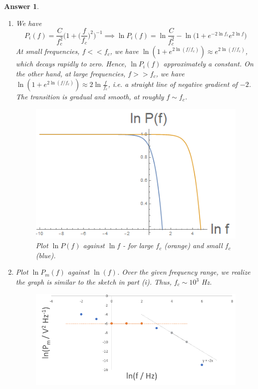 \documentclass[a4paper]{article}
\newtheorem{ans}{Answer}[subsection]
\theoremstyle{new}
\begin{document}
\begin{ans}\leavevmode
\begin{enumerate}[label=(\roman*)]
\item We have
$$P_i(f)=\frac{C}{f_c^2}\bigg(1+\bigg(\frac{f}{f_c}\bigg)^2\bigg)^{-1}\implies\ln P_i(f)=\ln\frac{C}{f_c^2}-\ln\bigg(1+e^{-2\ln f_c}e^{2\ln f}\bigg)$$
At small frequencies, $f<<f_c$, we have $\ln(1+e^{2\ln(f/f_c)})\approx e^{2\ln(f/f_c)}$, which decays rapidly to zero. Hence, $\ln P_i(f)$ approximately a constant. On the other hand, at large frequencies, $f>>f_c$, we have $\ln(1+e^{2\ln(f/f_c)})\approx2\ln\frac{f}{f_c}$, i.e. a straight line of negative gradient of $-2$. The transition is gradual and smooth, at roughly $f\sim f_c$.
\begin{figure}[H]
    \centering
    \includegraphics[scale=0.5]{2017P1D12i.PNG}
    \caption{Plot $\ln P(f)$ against $\ln f$ - for large $f_c$ (orange) and small $f_c$ (blue).}
\end{figure}
\item Plot $\ln P_m(f)$ against $\ln(f)$. Over the given frequency range, we realize the graph is similar to the sketch in part (i). Thus, $f_c\sim 10^3$ Hz.
\begin{figure}[H]
    \centering
    \includegraphics[scale=0.75]{2017P1D12ii.PNG}

\end{figure}
\end{enumerate}
\end{ans}
\end{document}
